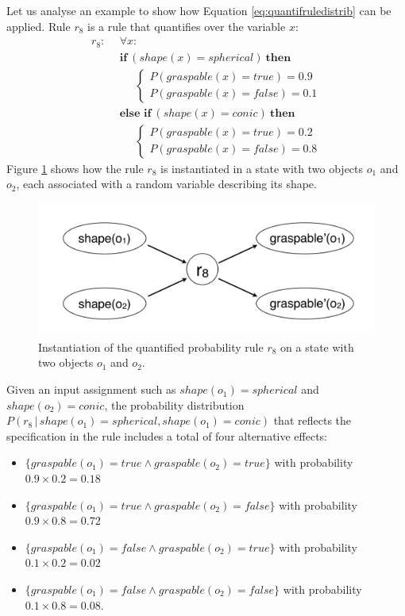 Let us analyse an example to show how Equation \eqref{eq:quantifruledistrib} can be applied. Rule $r_8$ is a rule that quantifies over the variable $x$: 
\begin{align*}
r_8: \ \ & \forall x: \\ 
& \textbf{if} \ (\mathit{shape}(x) = \mathit{spherical})  \ \textbf{then} \\ 
& \;\;\;\;\; \begin{cases}
P(\mathit{graspable}(x)\!=\!true) = 0.9 \\
P(\mathit{graspable}(x)\!=\!false) = 0.1
\end{cases} \\ 
&\textbf{else if} \ (\mathit{shape}(x) = \mathit{conic})  \ \textbf{then} \\ 
& \;\;\;\;\; \begin{cases}
P(\mathit{graspable}(x)\!=\!true) = 0.2 \\
P(\mathit{graspable}(x)\!=\!false) = 0.8
\end{cases}
\end{align*}
Figure \ref{fig:quantinstantitionprob} shows how the rule $r_8$ is instantiated in a state with two objects $o_1$ and $o_2$, each associated with a random variable describing its shape.

\begin{figure}[h]
\centering
\includegraphics[scale=0.25]{imgs/quantruleinstantiation.pdf}
\caption{Instantiation of the quantified probability rule $r_8$ on a state with two objects $o_1$ and $o_2$.}
\label{fig:quantinstantitionprob}
\end{figure}

Given an input assignment such as $shape(o_1) = \mathit{spherical}$ and $shape(o_2) = \mathit{conic}$, the probability distribution $P(r_8 \, | \, \mathit{shape}(o_1)\!=\!\mathit{spherical}, \mathit{shape}(o_1)\!=\!\mathit{conic})$ that reflects the specification in the rule includes a total of four alternative effects: \begin{itemize}
\item $\{\mathit{graspable}(o_1)\!=\!true \land \mathit{graspable}(o_2)\!=\!true \} $ with probability $0.9 \times 0.2 = 0.18$ 
\item $\{\mathit{graspable}(o_1)\!=\!true \land \mathit{graspable}(o_2)\!=\!false\}$ with probability $0.9 \times 0.8 = 0.72$ 
\item $\{\mathit{graspable}(o_1)\!=\!false \land \mathit{graspable}(o_2)\!=\!true \}$ with probability $0.1 \times 0.2 = 0.02$ 
\item $\{\mathit{graspable}(o_1)\!=\!false \land \mathit{graspable}(o_2)\!=\!false\}$ with probability $0.1 \times 0.8 = 0.08$. 
\end{itemize}

